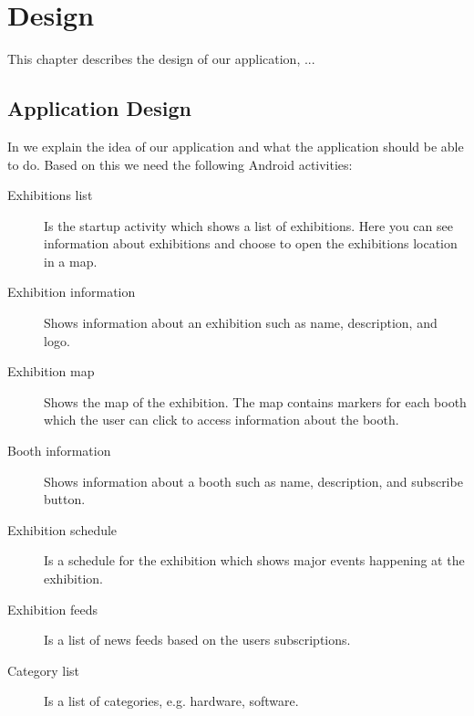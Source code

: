 \chapter{Design}
This chapter describes the design of our application, ... 

\section{Application Design}
In  we explain the idea of our application and what the application should be able to do. Based on this we need the following Android activities:

\begin{description}
\item[Exhibitions list] Is the startup activity which shows a list of exhibitions. Here you can see information about exhibitions and choose to open the exhibitions location in a map.
\item[Exhibition information] Shows information about an exhibition such as name, description, and logo.
\item[Exhibition map] Shows the map of the exhibition. The map contains markers for each booth which the user can click to access information about the booth.
\item[Booth information] Shows information about a booth such as name, description, and subscribe button.
\item[Exhibition schedule] Is a schedule for the exhibition which shows major events happening at the exhibition.
\item[Exhibition feeds] Is a list of news feeds based on the users subscriptions.
\item[Category list] Is a list of categories, e.g. hardware, software.
\end{description}

